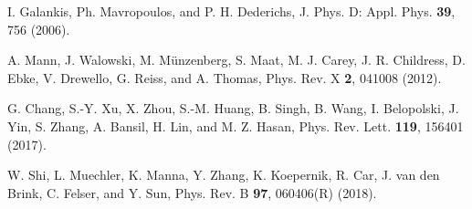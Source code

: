 \documentclass[preprint,5p]{elsarticle}
\begin{document}
\begin{thebibliography}{10}
 I. Galankis, Ph. Mavropoulos, and P. H. Dederichs,
J. Phys. D: Appl. Phys. {\bf 39}, 756 (2006).

 A. Mann, J. Walowski, M. M\"unzenberg, S. Maat, M. J. Carey, 
 J. R. Childress, D. Ebke, V. Drewello, G. Reiss, and A. Thomas,
 Phys. Rev. X {\bf 2}, 041008 (2012).

 G. Chang, S.-Y. Xu, X. Zhou, S.-M. Huang, B. Singh, B. Wang, I. Belopolski, J. Yin, 
 S. Zhang, A. Bansil, H. Lin, and M. Z. Hasan,
  Phys. Rev. Lett. {\bf 119}, 156401 (2017).

 W. Shi, L. Muechler, K. Manna, Y. Zhang, K. Koepernik, R. Car, J. van den Brink, 
 C. Felser, and Y. Sun,
 Phys. Rev. B {\bf 97}, 060406(R) (2018). 





\end{thebibliography}
\end{document}
